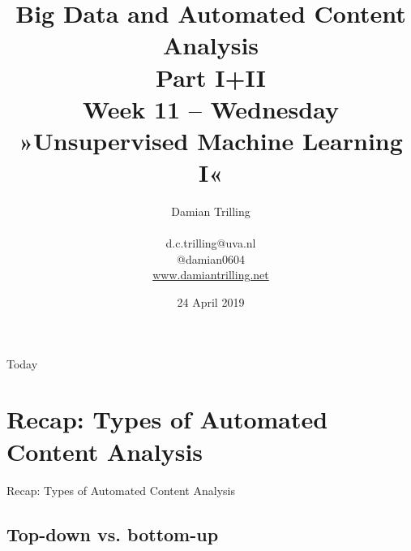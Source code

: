 \documentclass{beamer}
\begin{document}
\title[Big Data and Automated Content Analysis]{\textbf{Big Data and Automated Content Analysis\\ Part I+II} \\ Week 11 -- Wednesday \\ »Unsupervised Machine Learning I«}
\author[Damian Trilling]{Damian Trilling \\ ~ \\ \footnotesize{d.c.trilling@uva.nl \\@damian0604} \\ \url{www.damiantrilling.net}}
\date{24 April 2019}


\begin{frame}{}
\titlepage
\end{frame}

\begin{frame}{Today}
\tableofcontents
\end{frame}








\section[Recap]{Recap: Types of Automated Content Analysis}
\begin{frame}{}
Recap: Types of Automated Content Analysis
\end{frame}
\subsection*{Top-down vs. bottom-up}


\begin{frame}[plain]
\end{frame}
\end{document}
